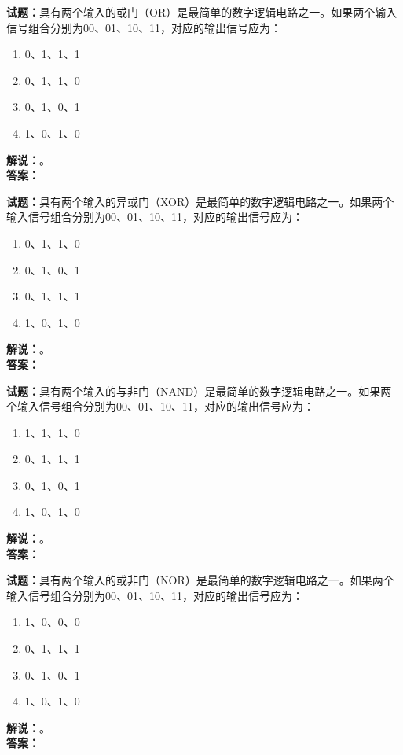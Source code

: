 \documentclass{ctexbook}
\begin{document}
\bigskip




\noindent\textbf{试题：}具有两个输入的或门（OR）是最简单的数字逻辑电路之一。如果两个输入信号组合分别为00、01、10、11，对应的输出信号应为：
\begin{enumerate}[leftmargin=3em]
\item 0、1、1、1
\item 0、1、1、0
\item 0、1、0、1
\item 1、0、1、0
\end{enumerate}
\noindent\textbf{解说：}\textbf{}。\\\noindent\textbf{答案：}

\bigskip




\noindent\textbf{试题：}具有两个输入的异或门（XOR）是最简单的数字逻辑电路之一。如果两个输入信号组合分别为00、01、10、11，对应的输出信号应为：
\begin{enumerate}[leftmargin=3em]
\item 0、1、1、0
\item 0、1、0、1
\item 0、1、1、1
\item 1、0、1、0
\end{enumerate}
\noindent\textbf{解说：}\textbf{}。\\\noindent\textbf{答案：}

\bigskip




\noindent\textbf{试题：}具有两个输入的与非门（NAND）是最简单的数字逻辑电路之一。如果两个输入信号组合分别为00、01、10、11，对应的输出信号应为：
\begin{enumerate}[leftmargin=3em]
\item 1、1、1、0
\item 0、1、1、1
\item 0、1、0、1
\item 1、0、1、0
\end{enumerate}
\noindent\textbf{解说：}\textbf{}。\\\noindent\textbf{答案：}

\bigskip




\noindent\textbf{试题：}具有两个输入的或非门（NOR）是最简单的数字逻辑电路之一。如果两个输入信号组合分别为00、01、10、11，对应的输出信号应为：
\begin{enumerate}[leftmargin=3em]
\item 1、0、0、0
\item 0、1、1、1
\item 0、1、0、1
\item 1、0、1、0
\end{enumerate}
\noindent\textbf{解说：}\textbf{}。\\\noindent\textbf{答案：}
\end{document}

